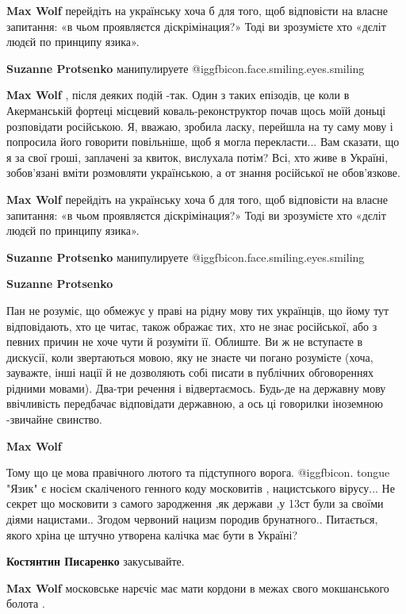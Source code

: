 \begin{itemize}
\begin{itemize}
\textbf{Max Wolf} перейдіть на українську хоча б для того, щоб відповісти на власне запитання: «в чьом проявляєтся діскрімінация?»
Тоді ви зрозумієте хто «дєліт людєй по принципу язика».

\textbf{Suzanne Protsenko} манипулируете  @igg{fbicon.face.smiling.eyes.smiling} 

\textbf{Max Wolf} , після деяких подій -так. Один з таких епізодів, це коли в Акерманській фортеці місцевий коваль-реконструктор почав щось моїй доньці розповідати російською. Я, вважаю, зробила ласку, перейшла на ту саму мову і попросила його говорити повільніше, щоб я могла перекласти... Вам сказати, що я за свої гроші, заплачені за квиток, вислухала потім? Всі, хто живе в Україні, зобов'язані вміти розмовляти українською, а от знання російської не обов'язкове.

\textbf{Max Wolf} перейдіть на українську хоча б для того, щоб відповісти на власне запитання: «в чьом проявляєтся діскрімінация?»
Тоді ви зрозумієте хто «дєліт людєй по принципу язика».

\textbf{Suzanne Protsenko} манипулируете  @igg{fbicon.face.smiling.eyes.smiling} 

\textbf{Suzanne Protsenko} 

Пан не розуміє, що обмежує у праві на рідну мову тих українців, що йому тут
відповідають, хто це читає, також ображає тих, хто не знає російської, або з
певних причин не хоче чути й розуміти її. Облиште. Ви ж не вступаєте в
дискусії, коли звертаються мовою, яку не знаєте чи погано розумієте (хоча,
зауважте, інші нації й не дозволяють собі писати в публічних обговореннях
рідними мовами). Два-три речення і відвертаємось. Будь-де на державну мову
ввічливість передбачає відповідати державною, а ось ці говорилки іноземною
-звичайне свинство.

\textbf{Max Wolf} 

Тому що це мова правічного лютого та підступного ворога.  @igg{fbicon. tongue} "Язик" є носієм
скаліченого генного коду московитів , нацистського вірусу... Не секрет що
московити з самого зародження ,як держави ,у 13ст були за своїми діями
нацистами.. Згодом червоний нацизм породив брунатного.. Питається, якого хріна це
штучно утворена калічка має бути в Україні?

\textbf{Костянтин Писаренко} закусывайте.

\textbf{Max Wolf} московське нарєчіє має мати кордони в межах свого мокшанського болота .


\end{itemize}
\end{itemize}
